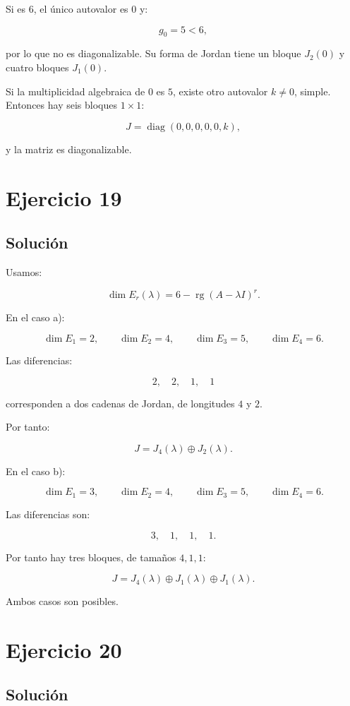\documentclass[11pt,a4paper]{article}
\newcommand{\rg}{\operatorname{rg}}
\newcommand{\diag}{\operatorname{diag}}
\begin{document}
Si es $6$, el único autovalor es $0$ y:

\[
g_0=5<6,
\]

por lo que no es diagonalizable. Su forma de Jordan tiene un bloque $J_2(0)$ y cuatro bloques $J_1(0)$.

Si la multiplicidad algebraica de $0$ es $5$, existe otro autovalor $k\neq0$, simple. Entonces hay seis bloques $1\times1$:

\[
\boxed{
J=
\diag(0,0,0,0,0,k),
}
\]

y la matriz es diagonalizable.

\section{Ejercicio 19}
\subsection{Solución}

Usamos:

\[
\dim E_r(\lambda)
=
6-\rg(A-\lambda I)^r.
\]

En el caso a):

\[
\dim E_1=2,\qquad
\dim E_2=4,\qquad
\dim E_3=5,\qquad
\dim E_4=6.
\]

Las diferencias:

\[
2,\quad2,\quad1,\quad1
\]

corresponden a dos cadenas de Jordan, de longitudes $4$ y $2$.

Por tanto:

\[
\boxed{
J=
J_4(\lambda)\oplus J_2(\lambda).
}
\]

En el caso b):

\[
\dim E_1=3,\qquad
\dim E_2=4,\qquad
\dim E_3=5,\qquad
\dim E_4=6.
\]

Las diferencias son:

\[
3,\quad1,\quad1,\quad1.
\]

Por tanto hay tres bloques, de tamaños $4,1,1$:

\[
\boxed{
J=
J_4(\lambda)
\oplus
J_1(\lambda)
\oplus
J_1(\lambda).
}
\]

Ambos casos son posibles.

\section{Ejercicio 20}
\subsection{Solución}
\end{document}
